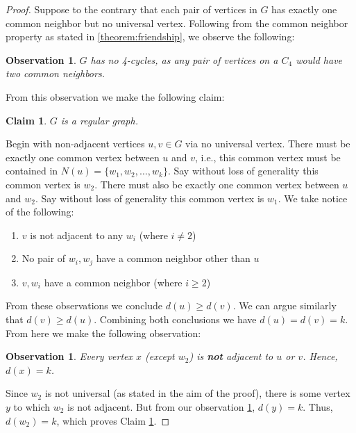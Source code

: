 \documentclass{article}
\newtheorem{observation}[theorem]{Observation}
\newtheorem{claim}[theorem]{Claim}
\begin{document}
\begin{proof}
\label{proof:friendship_theorem}
Suppose to the contrary that each pair of vertices in $G$ has exactly one common neighbor but no universal vertex. Following from the common neighbor property as stated in \ref{theorem:friendship}, we observe the following:

\begin{observation}
$G$ has no 4-cycles, as any pair of vertices on a $C_4$ would have two common neighbors. 
\end{observation}

From this observation we make the following claim:

\begin{claim}
\label{claim:regularity}
$G$ is a regular graph.
\end{claim}

Begin with non-adjacent vertices $u, v \in G$ via no universal vertex. There must be exactly one common vertex between $u$ and $v$, i.e., this common vertex must be contained in $N(u) = \{w_1, w_2, \dots , w_k\}$. Say without loss of generality this common vertex is $w_2$. There must also be exactly one common vertex between $u$ and $w_2$. Say without loss of generality this common vertex is $w_1$. We take notice of the following:

\begin{enumerate}
    \item $v$ is not adjacent to any $w_i$ (where $i \neq 2$)
    \item No pair of $w_i, w_j$ have a common neighbor other than $u$
    \item $v, w_i$ have a common neighbor (where $ i \geq 2$)
\end{enumerate}

From these observations we conclude $d(u) \geq d(v)$. We can argue similarly that $d(v) \geq d(u)$. Combining both conclusions we have $d(u) = d(v) = k$. From here we make the following observation:

\begin{observation}
\label{obs:adjacency}
Every vertex $x$ (except $w_2$) is \textbf{not} adjacent to $u$ or $v$. Hence, $d(x) = k$.
\end{observation}  

Since $w_2$ is not universal (as stated in the aim of the proof), there is some vertex $y$ to which $w_2$ is not adjacent. But from our observation \ref{obs:adjacency}, $d(y) = k$. Thus, $d(w_2) = k$, which proves Claim \ref{claim:regularity}. 


\end{proof}
\end{document}
